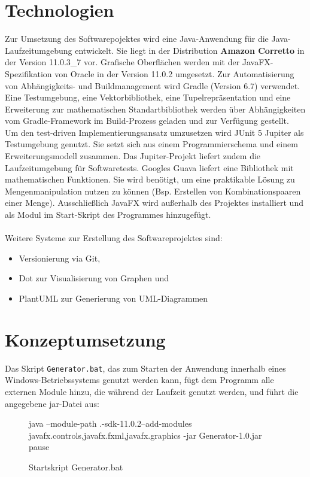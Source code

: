 \section{Technologien}
Zur Umsetzung des Softwarepojektes wird eine Java-Anwendung für die Java-Laufzeitumgebung entwickelt.
Sie liegt in der Distribution \textbf{Amazon Corretto} in der Version 11.0.3\_7 vor.
Grafische Oberflächen werden mit der JavaFX-Spezifikation von Oracle in der Version 11.0.2 umgesetzt.
Zur Automatisierung von Abhängigkeits- und Buildmanagement wird Gradle (Version 6.7) verwendet.
Eine Testumgebung, eine Vektorbibliothek, eine Tupelrepräsentation und eine Erweiterung zur mathematischen
Standartbibliothek werden über Abhängigkeiten vom Gradle-Framework im Build-Prozess geladen und zur Verfügung
gestellt.\\
Um den test-driven Implementierungsansatz umzusetzen wird JUnit 5 Jupiter als Testumgebung genutzt.
Sie setzt sich aus einem Programmierschema und einem Erweiterungsmodell zusammen.
Das Jupiter-Projekt liefert zudem die Laufzeitumgebung für Softwaretests.
Googles Guava liefert eine Bibliothek mit mathematischen Funktionen.
Sie wird benötigt, um eine praktikable Lösung zu Mengenmanipulation nutzen zu können (Bsp. Erstellen
von Kombinationspaaren einer Menge).
Ausschließlich JavaFX wird außerhalb des Projektes installiert und als Modul im Start-Skript des Programmes
hinzugefügt.
\\~\\
Weitere Systeme zur Erstellung des Softwareprojektes sind:
\begin{itemize}
    \item Versionierung via Git,
    \item Dot zur Visualisierung von Graphen und
    \item PlantUML zur Generierung von UML-Diagrammen
\end{itemize}

\newpage

\section{Konzeptumsetzung}

Das Skript \texttt{Generator.bat}, das zum Starten der Anwendung innerhalb eines Windows-Betriebssystems genutzt werden kann,
fügt dem Programm alle externen Module hinzu, die während der Laufzeit genutzt werden, und führt die angegebene jar-Datei aus:
\begin{figure}[H]
    \centering
    \begin{csource}
        java --module-path .\javafx-sdk-11.0.2\lib --add-modules javafx.controls,javafx.fxml,javafx.graphics -jar Generator-1.0.jar
        pause
    \end{csource}
    \caption{Startskript Generator.bat}
\end{figure}

